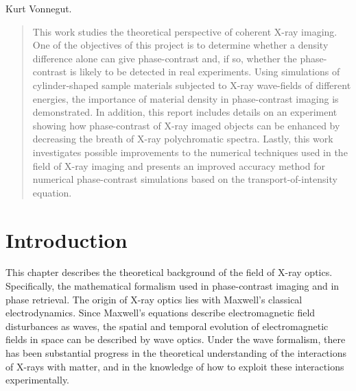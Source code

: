 \documentclass[10pt, a4paper, singlespacing]{report}
\begin{document}
\bigbreak

\hfill Kurt Vonnegut.

\vspace{20cm}


\tableofcontents %

\vspace{20cm}


\begin{abstract}\label{Abstract}
This work studies the theoretical perspective of coherent X-ray imaging. One of the objectives of this project is to determine whether a density difference alone can give phase-contrast and, if so, whether the phase-contrast is likely to be detected in real experiments. Using simulations of cylinder-shaped sample materials subjected to X-ray wave-fields of different energies, the importance of material density in phase-contrast imaging is demonstrated. In addition, this report includes details on an experiment showing how phase-contrast of X-ray imaged objects can be enhanced by decreasing the breath of X-ray polychromatic spectra. Lastly, this work investigates possible improvements to the numerical techniques used in the field of X-ray imaging and presents an improved accuracy method for numerical phase-contrast simulations based on the transport-of-intensity equation.
\end{abstract}

\chapter{Introduction}\label{Introduction}
This chapter describes the theoretical background of the field of X-ray optics. Specifically, the mathematical formalism used in phase-contrast imaging and in phase retrieval. The origin of X-ray optics lies with Maxwell's classical electrodynamics\cite{PagsTutes}. Since Maxwell's equations describe electromagnetic field disturbances as waves, the spatial and temporal evolution of electromagnetic ﬁelds in space can be described by wave optics. Under the wave formalism, there has been substantial progress in the theoretical understanding of the interactions of X-rays with matter, and in the knowledge of how to exploit these interactions experimentally.
\end{document}
